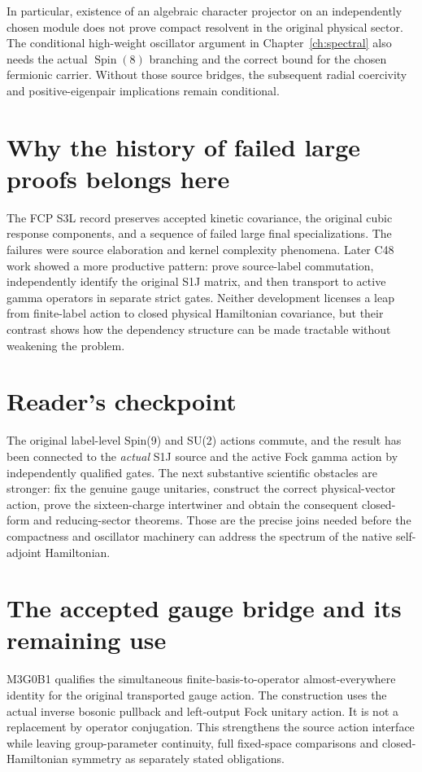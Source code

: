 In particular, existence of an algebraic character projector on an
independently chosen module does not prove compact resolvent in the
original physical sector. The conditional high-weight oscillator
argument in Chapter~\ref{ch:spectral} also needs the actual
$\operatorname{Spin}(8)$ branching and the correct bound for the
chosen fermionic carrier. Without those source bridges, the
subsequent radial coercivity and positive-eigenpair implications remain
conditional.

\section{Why the history of failed large proofs belongs here}
The FCP S3L record preserves accepted kinetic covariance, the
original cubic response components, and a sequence of failed large
final specializations. The failures were source elaboration and kernel
complexity phenomena. Later C48 work showed a more productive pattern:
prove source-label commutation, independently identify the original
S1J matrix, and then transport to active gamma operators in separate
strict gates. Neither development licenses a leap from finite-label
action to closed physical Hamiltonian covariance, but their contrast
shows how the dependency structure can be made tractable without
weakening the problem.

\section{Reader's checkpoint}
The original label-level Spin(9) and SU(2) actions commute, and the
result has been connected to the \emph{actual} S1J source and the
active Fock gamma action by independently qualified gates. The next
substantive scientific obstacles are stronger: fix the genuine gauge
unitaries, construct the correct physical-vector action, prove the
sixteen-charge intertwiner and obtain the consequent closed-form
and reducing-sector theorems. Those are the precise joins needed
before the compactness and oscillator machinery can address the
spectrum of the native self-adjoint Hamiltonian.

\section{The accepted gauge bridge and its remaining use}
\label{sec:ed08-gauge}
M3G0B1 qualifies the simultaneous finite-basis-to-operator
almost-everywhere identity for the original transported gauge action.
The construction uses the actual inverse bosonic pullback and
left-output Fock unitary action. It is not a replacement by operator
conjugation. This strengthens the source action interface while
leaving group-parameter continuity, full fixed-space comparisons
and closed-Hamiltonian symmetry as separately stated obligations.

